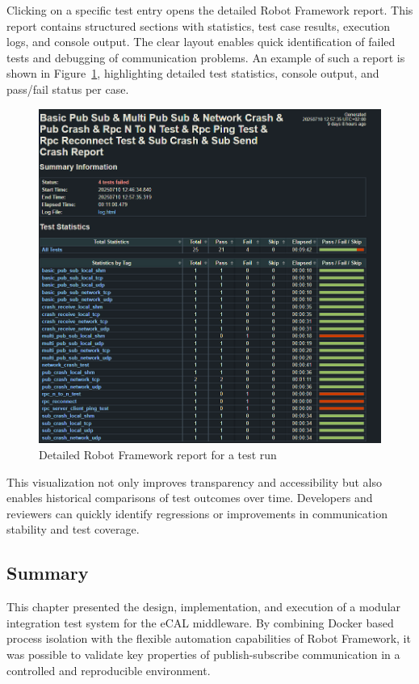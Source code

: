 \vspace{0.5em}
Clicking on a specific test entry opens the detailed Robot Framework report. This report contains structured sections with statistics, test case results, execution logs, and console output. The clear layout enables quick identification of failed tests and debugging of communication problems. An example of such a report is shown in Figure~\ref{fig:robot_report}, highlighting detailed test statistics, console output, and pass/fail status per case.
\begin{figure}[H]
	\centering
	\includegraphics[width=\textwidth]{Images/robot_report_example.png}
	\caption{Detailed Robot Framework report for a test run}
	\label{fig:robot_report}
\end{figure}

\vspace{0.5em}
This visualization not only improves transparency and accessibility but also enables historical comparisons of test outcomes over time. Developers and reviewers can quickly identify regressions or improvements in communication stability and test coverage.

\newpage
\subsection{Summary}

This chapter presented the design, implementation, and execution of a modular integration test system for the eCAL middleware. By combining Docker based process isolation with the flexible automation capabilities of Robot Framework, it was possible to validate key properties of publish-subscribe communication in a controlled and reproducible environment.

